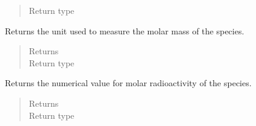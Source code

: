 \documentclass[letterpaper,10pt,openany,oneside,english]{sphinxmanual}
\begin{document}
\begin{fulllineitems}
\begin{fulllineitems}
\begin{quote}
\begin{description}
\item[{Return type}] \leavevmode
{}

\end{description}\end{quote}

\end{fulllineitems}


\begin{fulllineitems}
\label{\detokenize{support_rst/specie:specie.Specie.GetMolarMassUnit}}
Returns the unit used to measure the molar mass of the species.
\begin{quote}\begin{description}
\item[{Returns}] \leavevmode
{}

\item[{Return type}] \leavevmode
{}

\end{description}\end{quote}

\end{fulllineitems}


\begin{fulllineitems}
\label{\detokenize{support_rst/specie:specie.Specie.GetMolarRadioactivity}}
Returns the numerical value for molar radioactivity of the species.
\begin{quote}\begin{description}
\item[{Returns}] \leavevmode
{}

\item[{Return type}] \leavevmode
{}

\end{description}\end{quote}

\end{fulllineitems}


\end{fulllineitems}
\end{document}
